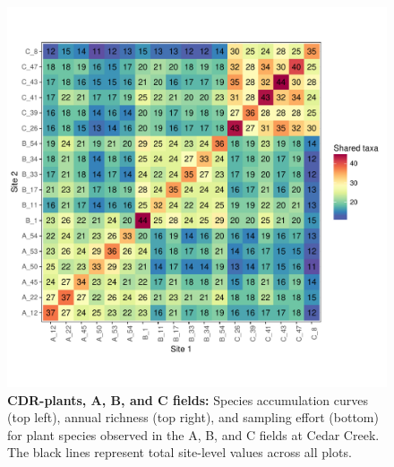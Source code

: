 \documentclass[11pt, oneside]{article}
\begin{document}
\begin{figure}[h!]
\includegraphics[scale = 0.4]{cdr-plantsABC-compagnoni_spp_shared.pdf}
\caption{{\bf CDR-plants, A, B, and C fields:} Species accumulation curves (top left),  annual richness (top right), and sampling effort (bottom)  for plant species observed in the A, B, and C fields at Cedar Creek. The black lines represent total site-level values across all plots.}
\label{cdrABC-plants}
\end{figure}
\end{document}
